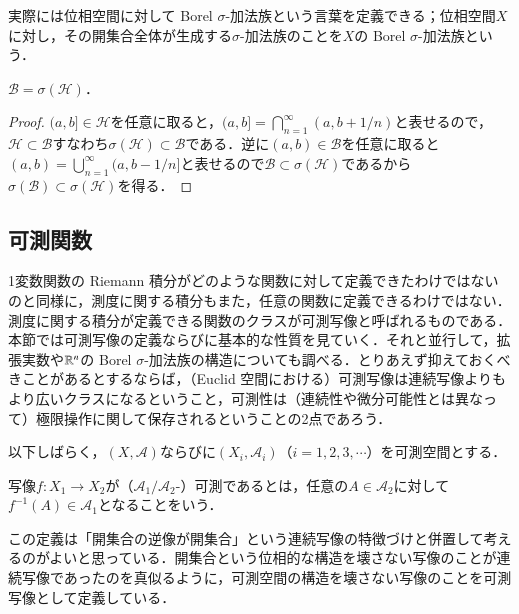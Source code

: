 \begin{dig}
実際には位相空間に対して Borel $\sigma$-加法族という言葉を定義できる；位相空間$X$に対し，その開集合全体が生成する$\sigma$-加法族のことを$X$の Borel $\sigma$-加法族という．
\end{dig}

\begin{prop}
$\mathcal{B} = \sigma(\mathcal{H})$．
\end{prop}

\begin{proof}
$(a,b] \in \mathcal{H}$を任意に取ると，$(a,b] = \bigcap_{n=1}^\infty (a,b + 1/n)$と表せるので，$\mathcal{H} \subset \mathcal{B}$すなわち$\sigma(\mathcal{H}) \subset \mathcal{B}$である．逆に$(a,b) \in \mathcal{B}$を任意に取ると$(a,b) = \bigcup_{n=1}^\infty (a,b-1/n]$と表せるので$\mathcal{B} \subset \sigma(\mathcal{H})$であるから$\sigma(\mathcal{B}) \subset \sigma(\mathcal{H})$を得る．
\end{proof}

\subsection{可測関数}

1変数関数の Riemann 積分がどのような関数に対して定義できたわけではないのと同様に，測度に関する積分もまた，任意の関数に定義できるわけではない．測度に関する積分が定義できる関数のクラスが可測写像と呼ばれるものである．本節では可測写像の定義ならびに基本的な性質を見ていく．それと並行して，拡張実数や$\mathbb{R}^n$の Borel $\sigma$-加法族の構造についても調べる．とりあえず抑えておくべきことがあるとするならば，（Euclid 空間における）可測写像は連続写像よりもより広いクラスになるということ，可測性は（連続性や微分可能性とは異なって）極限操作に関して保存されるということの2点であろう．

以下しばらく，$(X,\mathcal{A})$ならびに$(X_i,\mathcal{A}_i)$（$i=1,2,3,\cdots$）を可測空間とする．

\begin{defi}
写像$f \colon X_1 \to X_2$が（$\mathcal{A}_1/\mathcal{A}_2$-）可測であるとは，任意の$A \in \mathcal{A}_2$に対して$f^{-1}(A)  \in \mathcal{A}_1$となることをいう．
\end{defi}

\begin{dig}
この定義は「開集合の逆像が開集合」という連続写像の特徴づけと併置して考えるのがよいと思っている．開集合という位相的な構造を壊さない写像のことが連続写像であったのを真似るように，可測空間の構造を壊さない写像のことを可測写像として定義している．
\end{dig}

